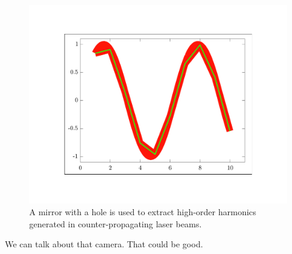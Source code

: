 \begin{figure}
    \centerline{\includegraphics{testfigure}}
    \caption[]{\label{fig:MirrorDiagram}
    A mirror with a hole is used to extract high-order harmonics generated in
    counter-propagating laser beams.}
\end{figure}



We can talk about that camera. That could be good. %